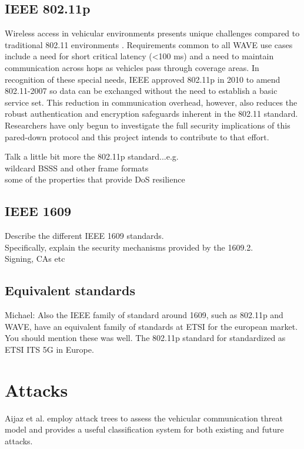 \documentclass[conference]{IEEEtran}
\begin{document}
\subsection{IEEE 802.11p}
Wireless access in vehicular environments presents unique challenges compared to traditional 802.11 environments \cite{karagiannis2011vehicular}. Requirements common to all WAVE use cases include a need for short critical latency (\textless 100 ms) and a need to maintain communication across hops as vehicles pass through coverage areas. In recognition of these special needs, IEEE approved 802.11p in 2010 to amend 802.11-2007 \cite{ieee11802} so data can be exchanged without the need to establish a basic service set. This reduction in communication overhead, however, also reduces the robust authentication and encryption safeguards inherent in the 802.11 standard. Researchers have only begun to investigate the full security implications of this pared-down protocol and this project intends to contribute to that effort.

Talk a little bit more the 802.11p standard...e.g. \\
wildcard BSSS and other frame formats\\
some of the properties that provide DoS resilience\\

\subsection{IEEE 1609}
Describe the different IEEE 1609 standards. \\
Specifically, explain the security mechanisms provided by the 1609.2.\\
Signing, CAs etc\\

\subsection{Equivalent standards}
Michael: Also the IEEE family of standard around 1609, such as 802.11p and WAVE, have an equivalent family of standards at ETSI for the european market. You should mention these was well. The 802.11p standard for standardized as ETSI ITS 5G in Europe.


\section{Attacks}
Aijaz et al. \cite{aijaz2006attacks} employ attack trees to assess the vehicular communication threat model and provides a useful classification system for both existing and future attacks. 
\end{document}
